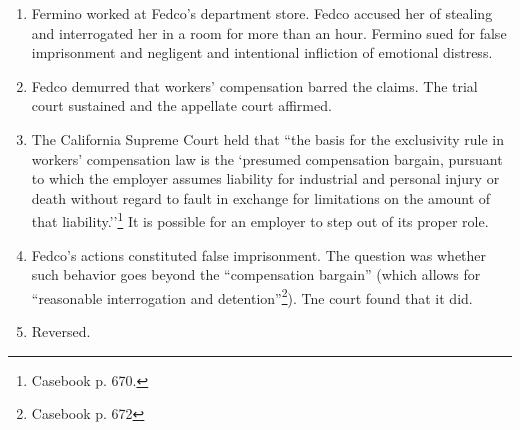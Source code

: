 \begin{enumerate}
    \item Fermino worked at Fedco's department store. Fedco accused her of 
    stealing and interrogated her in a room for more than an hour. Fermino 
    sued for false imprisonment and negligent and intentional infliction of 
    emotional distress.
    \item Fedco demurred that workers' compensation barred the claims. The 
    trial court sustained and the appellate court affirmed.
    \item The California Supreme Court held that ``the basis for the 
    exclusivity rule in workers' compensation law is the `presumed 
    compensation bargain, pursuant to which the employer assumes liability for 
    industrial and personal injury or death without regard to fault in 
    exchange for limitations on the amount of that 
    liability.''\footnote{Casebook p. 670.} It is possible for an employer to 
    step out of its proper role.
    \item Fedco's actions constituted false imprisonment. The question was 
    whether such behavior goes beyond the ``compensation bargain'' (which 
    allows for ``reasonable interrogation and detention''\footnote{Casebook 
    p. 672}). Tne court found that it did.
    \item Reversed.
\end{enumerate}
